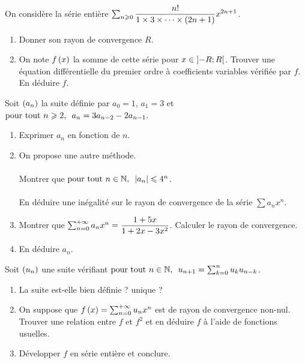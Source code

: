 \begin{exo}
On considère la série entière \(\sum_{n\geqslant0}\dfrac{n!}{1\times3\times\dots\times\left(2n+1\right)}x^{2n+1}\).

\begin{enumerate}
    \item Donner son rayon de convergence \(R\). \\
    \item On note \(f\left(x\right)\) la somme de cette série pour \(x\in\left]-R;R\right[\). Trouver une équation différentielle du premier ordre à coefficients variables vérifiée par \(f\). En déduire \(f\).
\end{enumerate}
\end{exo}

\begin{exo}
Soit \(\left(a_n\right)\) la suite définie par \(a_0=1\), \(a_1=3\) et \(\quantifs{\tpt n\geq2}a_n=3a_{n-2}-2a_{n-1}\).

\begin{enumerate}
    \item Exprimer \(a_n\) en fonction de \(n\). \\
    \item On propose une autre méthode. \\\\ Montrer que \(\quantifs{\tpt n\in\N}\abs{a_n}\leq4^n\). \\\\ En déduire une inégalité sur le rayon de convergence de la série \(\sum a_nx^n\). \\
    \item Montrer que \(\sum_{n=0}^{+\infty}a_nx^n=\dfrac{1+5x}{1+2x-3x^2}\). Calculer le rayon de convergence. \\
    \item En déduire \(a_n\).
\end{enumerate}
\end{exo}

\begin{exo}
Soit \(\left(u_n\right)\) une suite vérifiant \(\quantifs{\tpt n\in\N}u_{n+1}=\sum_{k=0}^nu_ku_{n-k}\).

\begin{enumerate}
    \item La suite est-elle bien définie ? unique ? \\
    \item On suppose que \(f\left(x\right)=\sum_{n=0}^{+\infty}u_nx^n\) est de rayon de convergence non-nul. Trouver une relation entre \(f\) et \(f^2\) et en déduire \(f\) à l'aide de fonctions usuelles. \\
    \item Développer \(f\) en série entière et conclure.
\end{enumerate}
\end{exo}

